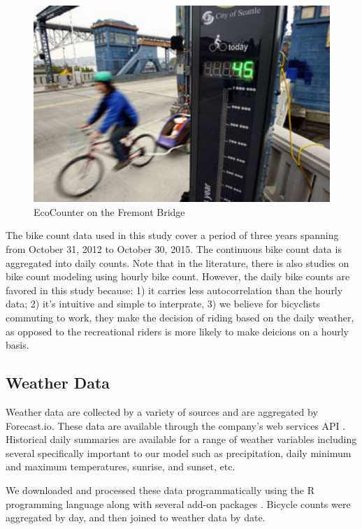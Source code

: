 \documentclass [11pt, proquest] {uwthesis}[2015/03/03]
\begin{document}
\begin{figure}
   \includegraphics[width=1\textwidth]{figures/FremontBikeEcoCounter.jpg} 
  \caption{EcoCounter on the Fremont Bridge}
  \label{fig:ecoCounter}
\end{figure}

The bike count data used in this study cover a period of three years spanning from October 31, 2012 to October 30, 2015. The continuous bike count data is aggregated into daily counts. Note that in the literature, there is also studies on bike count modeling using hourly bike count. However, the daily bike counts are favored in this study because: 1) it carries less autocorrelation than the hourly data; 2) it's intuitive and simple to interprate, 3) we believe for bicyclists commuting to work, they make the decision of riding based on the daily weather, as opposed to the recreational riders is more likely to make deicions on a hourly basis. 

\subsection{Weather Data}
Weather data are collected by a variety of sources and are aggregated by Forecast.io. These data are available through the company's web services API \cite{The-Dark-Sky-Company:aa}. Historical daily summaries are available for a range of weather variables including several specifically important to our model such as precipitation, daily minimum and maximum temperatures, sunrise, and sunset, etc.

We downloaded and processed these data programmatically using the R programming language along with several add-on packages \cite{Grolemund:2011aa,Wickham:2011aa,Couture-Beil:2014aa,Lang:2014aa,R-Core-Team:2014aa}. Bicycle counts were aggregated by day, and then joined to weather data by date. 
\end{document}
